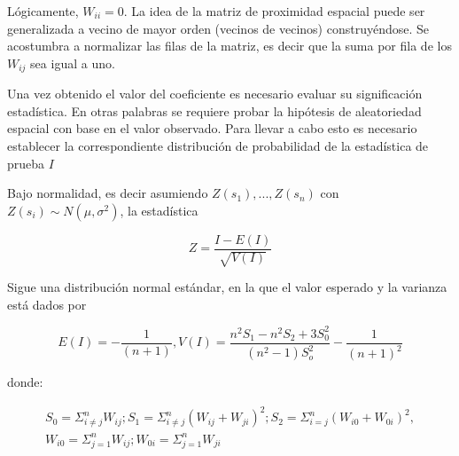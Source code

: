 Lógicamente, $W_{ii}=0$. La idea de la matriz de proximidad espacial puede ser generalizada a vecino de mayor orden (vecinos de vecinos) construyéndose. Se acostumbra a normalizar las filas de la matriz, es decir que la suma por fila de los $W_{ij}$ sea igual a uno.


Una vez obtenido el valor del coeficiente es necesario evaluar su significación estadística. En otras palabras se requiere probar la hipótesis de aleatoriedad espacial con base en el valor observado. Para llevar a cabo esto es necesario establecer la correspondiente distribución de probabilidad de la estadística de prueba $I$

Bajo normalidad, es decir asumiendo $Z(s_1), ..., Z(s_n)$ con $Z(s_i) \sim N(\mu, \sigma^2)$, la estadística 

$$Z = \frac{I - E(I)}{\sqrt{V(I)}}$$

Sigue una distribución normal estándar, en la que el valor esperado y la varianza está dados por

$$E(I) = -\frac{1}{(n+1)},  V(I)= \frac{n^2S_1-n^2S_2 + 3S^2_0}{(n^2-1)S^2_o} -\frac{1}{(n+1)^2} $$

donde:

\begin{eqnarray*} 
S_0 = \Sigma_{i \neq j}^nW_{ij};  S_1 =  \Sigma_{i \neq j}^n (W_{ij} + W_{ji})^2;   S_2 = \Sigma_{i = j}^n (W_{i0} + W_{0i})^2, \nonumber\\ W_{i0}= \Sigma_{j=1}^n W_{ij};  W_{0i}= \Sigma_{j=1}^n W_{ji} 
\end{eqnarray*}


\cite{giraldo}








